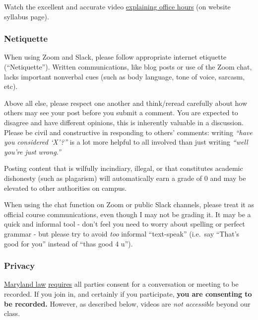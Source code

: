 \documentclass{article}
\begin{document}
Watch the excellent and accurate video
\href{https://vimeo.com/270014784}{explaining office hours} (on website
syllabus page).

\hypertarget{netiquette}{%
\subsubsection*{Netiquette}\label{netiquette}}

When using Zoom and Slack, please follow appropriate internet etiquette
(``Netiquette''). Written communications, like blog posts or use of the
Zoom chat, lacks important nonverbal cues (such as body language, tone
of voice, sarcasm, etc).

Above all else, please respect one another and think/reread carefully
about how others may see your post before you submit a comment. You are
expected to disagree and have different opinions, this is inherently
valuable in a discussion. Please be civil and constructive in responding
to others' comments: writing \emph{``have you considered `X'?''} is a
lot more helpful to all involved than just writing \emph{``well you're
just wrong.''}

Posting content that is wilfully incindiary, illegal, or that
constitutes academic dishonesty (such as plagarism) will automatically
earn a grade of 0 and may be elevated to other authorities on campus.

When using the chat function on Zoom or public Slack channels, please
treat it as official course communications, even though I may not be
grading it. It may be a quick and informal tool - don't feel you need to
worry about spelling or perfect grammar - but please try to avoid
\emph{too} informal ``text-speak'' (i.e.~say ``That's good for you''
instead of ``thas good 4 u'').

\hypertarget{privacy}{%
\subsubsection*{Privacy}\label{privacy}}

\href{https://www.execvision.io/blog/maryland-call-recording-laws/}{Maryland
law}
\href{https://law.justia.com/codes/maryland/2005/gcj/10-402.html}{requires}
all parties consent for a conversation or meeting to be recorded. If you
join in, and certainly if you participate, \textbf{you are consenting to
be recorded.} However, as described below, videos are \emph{not
accessible} beyond our class.
\end{document}
